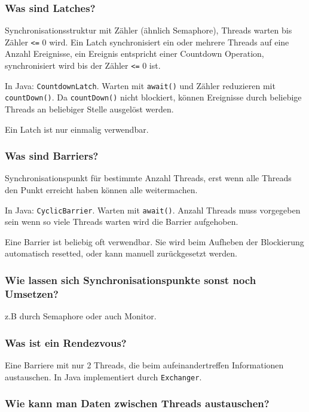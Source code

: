 \documentclass[10pt,a4paper]{scrartcl}
\begin{document}
\subsubsection{Was sind Latches? }

Synchronisationsstruktur mit Zähler (ähnlich Semaphore), Threads warten bis Zähler \texttt{<=} 0 wird.
Ein Latch synchronisiert ein oder mehrere Threads auf eine Anzahl Ereignisse, ein Ereignis
entspricht einer Countdown Operation, synchronisiert wird bis der Zähler \texttt{<=} 0 ist.

In Java: \texttt{CountdownLatch}. Warten mit \texttt{await()} und Zähler reduzieren mit
\texttt{countDown()}. Da \texttt{countDown()} nicht blockiert, können Ereignisse durch beliebige
Threads an beliebiger Stelle ausgelöst werden.

Ein Latch ist nur einmalig verwendbar.
  
\subsubsection{Was sind Barriers?}

Synchronisationspunkt für bestimmte Anzahl Threads, erst wenn alle Threads den Punkt erreicht haben
können alle weitermachen.

In Java: \texttt{CyclicBarrier}. Warten mit \texttt{await()}. Anzahl Threads muss vorgegeben sein
wenn so viele Threads warten wird die Barrier aufgehoben.

Eine Barrier ist beliebig oft verwendbar. Sie wird beim Aufheben der Blockierung automatisch
resetted, oder kann manuell zurückgesetzt werden.
  
\subsubsection{Wie lassen sich Synchronisationspunkte sonst noch Umsetzen?}

z.B durch Semaphore oder auch Monitor.
  
\subsubsection{Was ist ein Rendezvous?}

Eine Barriere mit nur 2 Threads, die beim aufeinandertreffen Informationen austauschen.
In Java implementiert durch \texttt{Exchanger}.
  
\subsubsection{Wie kann man Daten zwischen Threads austauschen?}
\end{document}
